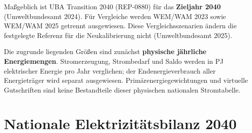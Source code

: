 \documentclass[
  ngerman,
  a4paper,
  DIV=11]{scrreprt}
\begin{document}
\begin{enumerate}
  Maßgeblich ist UBA Transition 2040 (REP-0880) für das \textbf{Zieljahr
  2040} (Umweltbundesamt 2024). Für Vergleiche werden WEM/WAM 2023 sowie
  WEM/WAM 2025 getrennt ausgewiesen. Diese Vergleichsszenarien ändern
  die festgelegte Referenz für die Neukalibrierung nicht
  (Umweltbundesamt 2025).

  Die zugrunde liegenden Größen sind zunächst \textbf{physische
  jährliche Energiemengen}. Stromerzeugung, Strombedarf und Saldo werden
  in PJ elektrischer Energie pro Jahr verglichen; der
  Endenergieverbrauch aller Energieträger wird separat ausgewiesen.
  Primärenergiegewichtungen und virtuelle Gutschriften sind keine
  Bestandteile dieser physischen nationalen Stromtabelle.

  \section{Nationale Elektrizitätsbilanz
  2040}\label{nationale-elektrizituxe4tsbilanz-2040}
\end{enumerate}
\end{document}
